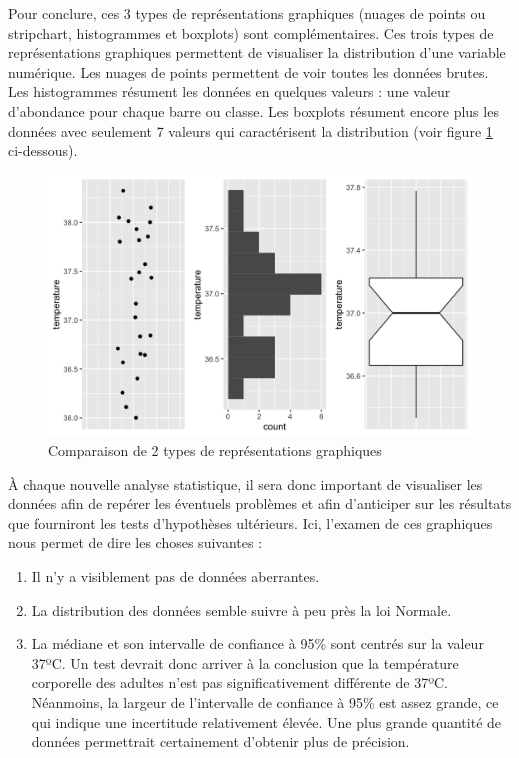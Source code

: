\documentclass[a4paperpaper,]{article}
\providecommand{\tightlist}{%
  \setlength{\itemsep}{0pt}\setlength{\parskip}{0pt}}
\begin{document}
Pour conclure, ces 3 types de représentations graphiques (nuages de points ou stripchart, histogrammes et boxplots) sont complémentaires. Ces trois types de représentations graphiques permettent de visualiser la distribution d'une variable numérique. Les nuages de points permettent de voir toutes les données brutes. Les histogrammes résument les données en quelques valeurs : une valeur d'abondance pour chaque barre ou classe. Les boxplots résument encore plus les données avec seulement 7 valeurs qui caractérisent la distribution (voir figure \ref{fig:compdistr} ci-dessous).

\begin{figure}[htpb]

{\centering \includegraphics[width=0.9\linewidth]{figure/compdistr-1} 

}

\caption{Comparaison de 2 types de représentations graphiques}\label{fig:compdistr}
\end{figure}

À chaque nouvelle analyse statistique, il sera donc important de visualiser les données afin de repérer les éventuels problèmes et afin d'anticiper sur les résultats que fourniront les tests d'hypothèses ultérieurs. Ici, l'examen de ces graphiques nous permet de dire les choses suivantes :

\begin{enumerate}
\def\labelenumi{\arabic{enumi}.}
\tightlist
\item
  Il n'y a visiblement pas de données aberrantes.
\item
  La distribution des données semble suivre à peu près la loi Normale.
\item
  La médiane et son intervalle de confiance à 95\% sont centrés sur la valeur 37ºC. Un test devrait donc arriver à la conclusion que la température corporelle des adultes n'est pas significativement différente de 37ºC. Néanmoins, la largeur de l'intervalle de confiance à 95\% est assez grande, ce qui indique une incertitude relativement élevée. Une plus grande quantité de données permettrait certainement d'obtenir plus de précision.
\end{enumerate}
\end{document}
